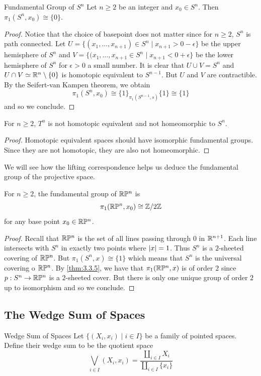 \documentclass[a4paper]{article}
\begin{document}
\begin{thm}{Fundamental Group of $S^n$}{} Let $n\geq 2$ be an integer and $x_0\in S^n$. Then $\pi_1(S^n,x_0)\cong\{0\}$. \tcbline
\begin{proof}
Notice that the choice of basepoint does not matter since for $n\geq 2$, $S^n$ is path connected. Let $U=\{(x_1,\dots,x_{n+1})\in S^n\;|\;x_{n+1}>0-\epsilon\}$ be the upper hemisphere of $S^n$ and $V=\{(x_1,\dots,x_{n+1}\in S^n\;|\; x_{n+1}<0+\epsilon\}$ be the lower hemisphere of $S^n$ for $\epsilon>0$ a small number. It is clear that $U\cup V=S^n$ and $U\cap V\simeq\mathbb{R}^n\setminus\{0\}$ is homotopic equivalent to $S^{n-1}$. But $U$ and $V$ are contractible. By the Seifert-van Kampen theorem, we obtain $$\pi_1(S^n,x_0)\cong\{1\}_{\pi_1(S^{n-1},s)}\{1\}\cong\{1\}$$ and so we conclude. 
\end{proof}
\end{thm}

\begin{crl}{}{} For $n\geq 2$, $T^n$ is not homotopic equivalent and not homeomorphic to $S^n$. \tcbline
\begin{proof}
Homotopic equivalent spaces should have isomorphic fundamental groups. Since they are not homotopic, they are also not homeomorphic. 
\end{proof}
\end{crl}

We will see how the lifting correspondence helps us deduce the fundamental group of the projective space. 

\begin{thm}{}{} For $n\geq 2$, the fundamental group of $\mathbb{R}\mathbb{P}^n$ is $$\pi_1(\mathbb{R}\mathbb{P}^n,x_0)\cong\mathbb{Z}/2\mathbb{Z}$$ for any base point $x_0\in\mathbb{R}\mathbb{P}^n$. \tcbline
\begin{proof}
Recall that $\mathbb{R}\mathbb{P}^n$ is the set of all lines passing through $0$ in $\mathbb{R}^{n+1}$. Each line intersects with $S^n$ in exactly two points where $\abs{x}=1$. Thus $S^n$ is a $2$-sheeted covering of $\mathbb{R}\mathbb{P}^n$. But $\pi_1(S^n,x)\cong\{1\}$ which means that $S^n$ is the universal covering o $\mathbb{R}\mathbb{P}^n$. By \ref{thm:3.3.5}, we have that $\pi_1(\mathbb{R}\mathbb{P}^n,x)$ is of order $2$ since $p:S^n\to\mathbb{R}\mathbb{P}^n$ is a $2$-sheeted cover. But there is only one unique group of order $2$ up to isomorphism and so we conclude. 
\end{proof}
\end{thm}

\subsection{The Wedge Sum of Spaces}
\begin{defn}{Wedge Sum of Spaces}{} Let $\{(X_i,x_i)\;|\;i\in I\}$ be a family of pointed spaces. Define their wedge sum to be the quotient space $$\bigvee_{i\in I}(X_i,x_i)=\frac{\coprod_{i\in I}X_i}{\coprod_{i\in I}\{x_i\}}$$
\end{defn}
\end{document}
